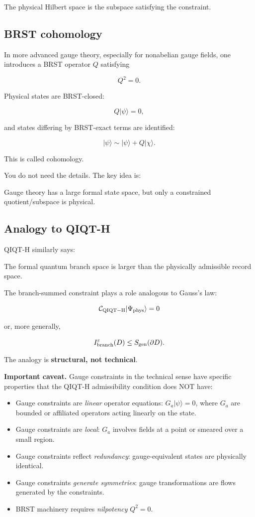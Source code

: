 \documentclass[11pt,a4paper]{article}
\newenvironment{qiqtquote}{\begin{mdframed}[style=quotestyle]}{\end{mdframed}}
\begin{document}
The physical Hilbert space is the subspace satisfying the constraint.

\subsection{BRST cohomology}

In more advanced gauge theory, especially for nonabelian gauge fields, one introduces a BRST operator $Q$ satisfying

\[
Q^2=0.
\]

Physical states are BRST-closed:

\[
Q|\psi\rangle=0,
\]

and states differing by BRST-exact terms are identified:

\[
|\psi\rangle \sim |\psi\rangle+Q|\chi\rangle.
\]

This is called cohomology.

You do not need the details. The key idea is:

\begin{qiqtquote}
Gauge theory has a large formal state space, but only a constrained quotient/subspace is physical.
\end{qiqtquote}

\subsection{Analogy to QIQT-H}

QIQT-H similarly says:

\begin{qiqtquote}
The formal quantum branch space is larger than the physically admissible record space.
\end{qiqtquote}

The branch-summed constraint plays a role analogous to Gauss’s law:

\[
\mathcal{C}_{\rm QIQT-H}|\Psi_{\rm phys}\rangle=0
\]

or, more generally,

\[
I_{\rm branch}^\varepsilon(D)\leq S_{\rm gen}(\partial D).
\]

The analogy is \textbf{structural, not technical}.

\textbf{Important caveat.} Gauge constraints in the technical sense have specific properties that the QIQT-H admissibility condition does NOT have:

\begin{itemize}
  \item Gauge constraints are \emph{linear} operator equations: $G_a|\psi\rangle = 0$, where $G_a$ are bounded or affiliated operators acting linearly on the state.
  \item Gauge constraints are \emph{local}: $G_a$ involves fields at a point or smeared over a small region.
  \item Gauge constraints reflect \emph{redundancy}: gauge-equivalent states are physically identical.
  \item Gauge constraints \emph{generate symmetries}: gauge transformations are flows generated by the constraints.
  \item BRST machinery requires \emph{nilpotency} $Q^2 = 0$.
\end{itemize}
\end{document}
